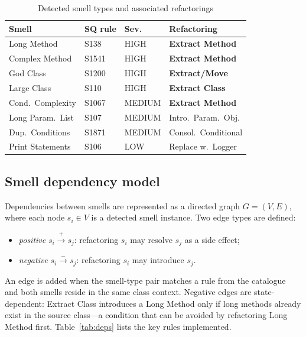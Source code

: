 \documentclass[conference]{IEEEtran}
\begin{document}

\begin{table}[tb]
\caption{Detected smell types and associated refactorings}
\label{tab:smells}
\centering
\footnotesize
\setlength{\tabcolsep}{3.5pt}
\begin{tabular}{@{}llll@{}}
\toprule
\textbf{Smell} & \textbf{SQ rule} & \textbf{Sev.} & \textbf{Refactoring} \\
\midrule
Long Method          & S138  & HIGH   & \textbf{Extract Method} \\
Complex Method       & S1541 & HIGH   & \textbf{Extract Method} \\
God Class            & S1200 & HIGH   & \textbf{Extract/Move} \\
Large Class          & S110  & HIGH   & \textbf{Extract Class} \\
Cond.\ Complexity    & S1067 & MEDIUM & \textbf{Extract Method} \\
Long Param.\ List    & S107  & MEDIUM & Intro.\ Param.\ Obj. \\
Dup.\ Conditions     & S1871 & MEDIUM & Consol.\ Conditional \\
Print Statements     & S106  & LOW    & Replace w.\ Logger \\
\bottomrule
\end{tabular}
\end{table}

\subsection{Smell dependency model}

Dependencies between smells are represented as a directed graph $G=(V,E)$,
where each node $s_i \in V$ is a detected smell instance.
Two edge types are defined:
\begin{itemize}
  \item \textit{positive} $s_i \xrightarrow{+} s_j$: refactoring $s_i$
        may resolve $s_j$ as a side effect;
  \item \textit{negative} $s_i \xrightarrow{-} s_j$: refactoring $s_i$
        may introduce $s_j$.
\end{itemize}
An edge is added when the smell-type pair matches a rule from the
catalogue~\cite{markovic2016refaktorovanie} and both smells reside in the same
class context.
Negative edges are state-dependent: Extract Class introduces a Long Method
only if long methods already exist in the source class---a condition that can
be avoided by refactoring Long Method first.
Table~\ref{tab:deps} lists the key rules implemented.
\end{document}

